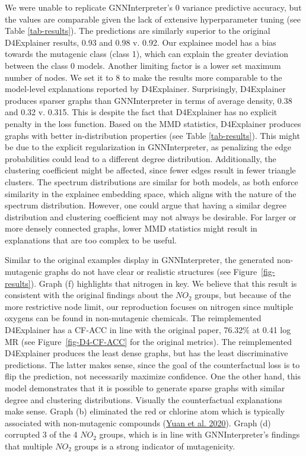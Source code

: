\documentclass[
  11pt,
  letterpaper,
]{article}
\begin{document}
\quad We were unable to replicate GNNInterpreter's 0 variance predictive
accuracy, but the values are comparable given the lack of extensive
hyperparameter tuning (see Table \ref{tab-results}). The predictions are
similarly superior to the original D4Explainer results, 0.93 and 0.98 v.
0.92. Our explainee model has a bias towards the mutagenic class (class
1), which can explain the greater deviation between the class 0 models.
Another limiting factor is a lower set maximum number of nodes. We set
it to 8 to make the results more comparable to the model-level
explanations reported by D4Explainer. Surprisingly, D4Explainer produces
sparser graphs than GNNInterpreter in terms of average density, 0.38 and
0.32 v. 0.315. This is despite the fact that D4Explainer has no explicit
penalty in the loss function. Based on the MMD statistics, D4Explainer
produces graphs with better in-distribution properties (see Table
\ref{tab-results}). This might be due to the explicit regularization in
GNNInterpreter, as penalizing the edge probabilities could lead to a
different degree distribution. Additionally, the clustering coefficient
might be affected, since fewer edges result in fewer triangle clusters.
The spectrum distributions are similar for both models, as both enforce
similarity in the explainee embedding space, which aligns with the
nature of the spectrum distribution. However, one could argue that
having a similar degree distribution and clustering coefficient may not
always be desirable. For larger or more densely connected graphs, lower
MMD statistics might result in explanations that are too complex to be
useful.

\quad Similar to the original examples display in GNNInterpreter, the
generated non-mutagenic graphs do not have clear or realistic structures
(see Figure~\ref{fig-results}). Graph (f) highlights that nitrogen in
key. We believe that this result is consistent with the original
findings about the \(NO_2\) groups, but because of the more restrictive
node limit, our reproduction focuses on nitrogen since multiple oxygens
can be found in non-mutagenic chemicals. The reimplemented D4Explainer
has a CF-ACC in line with the original paper, 76.32\% at 0.41 log MR
(see Figure~\ref{fig-D4-CF-ACC} for the original metrics). The
reimplemented D4Explainer produces the least dense graphs, but has the
least discriminative predictions. The latter makes sense, since the goal
of the counterfactual loss is to flip the prediction, not necessarily
maximize confidence. One the other hand, this model demonstrates that it
is possible to generate sparse graphs with similar degree and clustering
distributions. Visually the counterfactual explanations make sense.
Graph (b) eliminated the red or chlorine atom which is typically
associated with non-mutagenic compounds
(\protect\hyperlink{ref-Yuan_Tang_Hu_Ji_2020}{Yuan et al. 2020}). Graph
(d) corrupted 3 of the 4 \(NO_2\) groups, which is in line with
GNNInterpreter's findings that multiple \(NO_2\) groups is a strong
indicator of mutagenicity.
\end{document}
